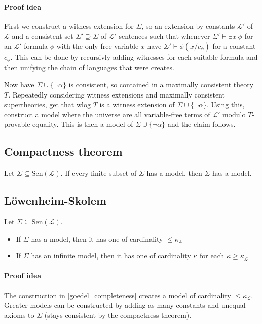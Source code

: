 \documentclass{scrartcl}
\begin{document}
\paragraph{Proof idea} First we construct a witness extension for $\Sigma$, so an extension by constants $\mathcal{L}'$ of $\mathcal{L}$ and a consistent set $\Sigma' \supseteq \Sigma$ of $\mathcal{L}'$-sentences such that whenever $\Sigma' \vdash \exists x \ \phi$ for an $\mathcal{L}'$-formula $\phi$ with the only free variable $x$ have $\Sigma' \vdash \phi(x/c_{\phi})$ for a constant $c_\phi$. This can be done by recursivly adding witnesses for each suitable formula and then unifying the chain of languages that were creates.

Now have $\Sigma \cup \{\neg \alpha\}$ is consistent, so contained in a maximally consistent theory $T$. Repeatedly considering witness extensions and maximally consistent supertheories, get that wlog $T$ is a witness extension of $\Sigma \cup \{\neg \alpha\}$. Using this, construct a model where the universe are all variable-free terms of $\mathcal{L}'$ modulo $T$-provable equality. This is then a model of $\Sigma \cup \{\neg \alpha\}$ and the claim follows. 

\subsection{Compactness theorem}
\label{compactness_theorem}
Let $\Sigma \subseteq \mathrm{Sen}(\mathcal{L})$. If every finite subset of $\Sigma$ has a model, then $\Sigma$ has a model.

\subsection{Löwenheim-Skolem}
Let $\Sigma \subseteq \mathrm{Sen}(\mathcal{L})$.
\begin{itemize}
    \item If $\Sigma$ has a model, then it has one of cardinality $\leq \kappa_{\mathcal{L}}$
    \item If $\Sigma$ has an infinite model, then it has one of cardinality $\kappa$ for each $\kappa \geq \kappa_{\mathcal{L}}$
\end{itemize}
\paragraph{Proof idea} The construction in \ref{goedel_completeness} creates a model of cardinality $\leq \kappa_{\mathcal{L}}$. Greater models can be constructed by adding as many constants and unequal-axioms to $\Sigma$ (stays consistent by the compactness theorem).
\end{document}
